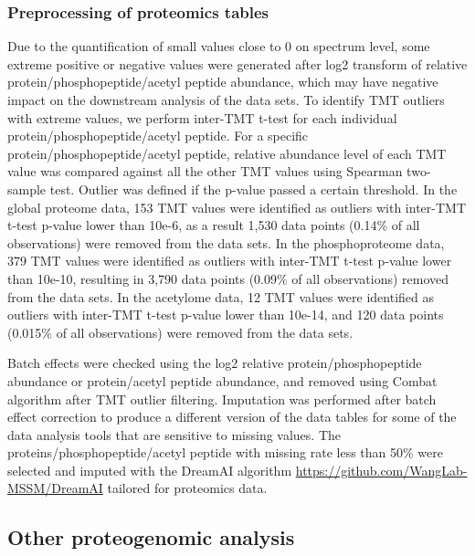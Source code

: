 \subsubsection{Preprocessing of proteomics tables}
Due to the quantification of small values close to 0 on spectrum level, some extreme positive or negative values were generated after log2 transform of relative protein/phosphopeptide/acetyl peptide abundance, which may have negative impact on the downstream analysis of the data sets. To identify TMT outliers with extreme values, we perform inter-TMT t-test for each individual protein/phosphopeptide/acetyl peptide. For a specific protein/phosphopeptide/acetyl peptide, relative abundance level of each TMT value was compared against all the other TMT values using Spearman two-sample test. Outlier was defined if the p-value passed a certain threshold. In the global proteome data, 153 TMT values were identified as outliers with inter-TMT t-test p-value lower than 10e-6, as a result 1,530 data points (0.14\% of all observations) were removed from the data sets. In the phosphoproteome data, 379 TMT values were identified as outliers with inter-TMT t-test p-value lower than 10e-10, resulting in 3,790 data points (0.09\% of all observations) removed from the data sets. In the acetylome data, 12 TMT values were identified as outliers with inter-TMT t-test p-value lower than 10e-14, and 120 data points (0.015\% of all observations) were removed from the data sets.

Batch effects were checked using the log2 relative protein/phosphopeptide abundance or protein/acetyl peptide abundance, and removed using Combat algorithm \cite{beausoleilsa_gygisp:ProbabilitybasedApproach2006} after TMT outlier filtering. Imputation was performed after batch effect correction to produce a different version of the data tables for some of the data analysis tools that are sensitive to missing values. The proteins/phosphopeptide/acetyl peptide with missing rate less than 50\% were selected and imputed with the DreamAI algorithm \url{https://github.com/WangLab-MSSM/DreamAI} tailored for proteomics data.


\subsection{Other proteogenomic analysis}

